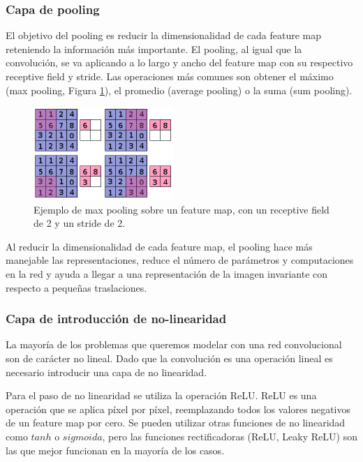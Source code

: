 \documentclass[spanish]{report}
\begin{document}

\subsubsection{Capa de pooling}


El objetivo del pooling es reducir la dimensionalidad de cada feature map reteniendo la información más importante. El pooling, al igual que la convolución, se va aplicando a lo largo y ancho del feature map con su respectivo receptive field y stride. Las operaciones más comunes son obtener el máximo (max pooling, Figura \ref{fig:pooling}), el promedio (average pooling) o la suma (sum pooling).

\begin{figure}[h]
\centering
 \includegraphics[width=200px]{pooling.png}
   \caption{Ejemplo de max pooling sobre un feature map, con un receptive field de 2 y un stride de 2.}
  \label{fig:pooling}
\end{figure}

Al reducir la dimensionalidad de cada feature map, el pooling hace más manejable las representaciones, reduce el número de parámetros y computaciones en la red y ayuda a llegar a una representación de la imagen invariante con respecto a pequeñas traslaciones.

\subsubsection{Capa de introducción de no-linearidad}

La mayoría de los problemas que queremos modelar con una red convolucional son de carácter no lineal. Dado que la convolución es una operación lineal es necesario introducir una capa de no linearidad.

Para el paso de no linearidad se utiliza la operación ReLU. ReLU es una operación que se aplica píxel por píxel, reemplazando todos los valores negativos de un feature map por cero. Se pueden utilizar otras funciones de no linearidad como $tanh$ o $sigmoida$, pero las funciones rectificadoras (ReLU, Leaky ReLU) son las que mejor funcionan en la mayoría de los casos.
\end{document}
